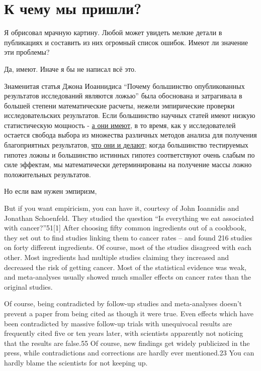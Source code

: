 \chapter{К чему мы пришли?}
\label{chp11}

Я обрисовал мрачную картину. Любой может увидеть мелкие детали в публикациях и составить из них огромный список ошибок. Имеют ли значение эти проблемы?

Да, имеют. Иначе я бы не написал всё это.

Знаменитая статья Джона Иоаннидиса ``Почему большинство опубликованных результатов исследований являются ложью''\cite{ioannidis_why_2005} была обоснована и затрагивала в большей степени математические расчеты, нежели эмпирические проверки исследовательских результатов. Если большинство научных статей имеют низкую статистическую мощность - \hyperref[chp3]{а они имеют}, в то время, как у исследователей остается свобода выбора из множества различных методов анализа для получения благоприятных результатов, \hyperref[chp8]{что они и делают}; когда большинство тестируемых гипотез ложны и большинство истинных гипотез соответствуют очень слабым по силе эффектам, мы математически детерминированы на получение массы ложно положительных результатов. 

Но если вам нужен эмпиризм,

But if you want empiricism, you can have it, courtesy of John Ioannidis and Jonathan Schoenfeld. They studied the question “Is everything we eat associated with cancer?”51[1] After choosing fifty common ingredients out of a cookbook, they set out to find studies linking them to cancer rates – and found 216 studies on forty different ingredients. Of course, most of the studies disagreed with each other. Most ingredients had multiple studies claiming they increased and decreased the risk of getting cancer. Most of the statistical evidence was weak, and meta-analyses usually showed much smaller effects on cancer rates than the original studies.

Of course, being contradicted by follow-up studies and meta-analyses doesn’t prevent a paper from being cited as though it were true. Even effects which have been contradicted by massive follow-up trials with unequivocal results are frequently cited five or ten years later, with scientists apparently not noticing that the results are false.55 Of course, new findings get widely publicized in the press, while contradictions and corrections are hardly ever mentioned.23 You can hardly blame the scientists for not keeping up.

